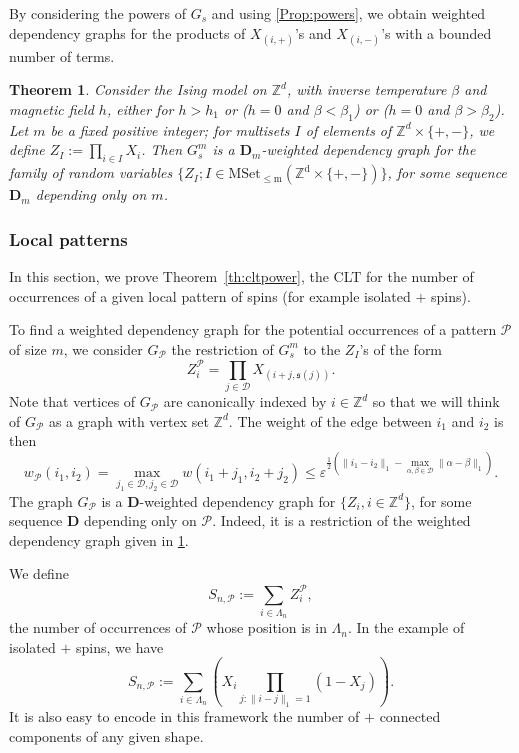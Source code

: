 \documentclass{amsart}
\newcommand{\field}[1]{\mathbb{#1}}
\newcommand{\Z}{\field{Z}}
\def\WDep{G}
\def\eps{\varepsilon}
\newcommand{\dist}[2]{\|#1 - #2\|_1}
\numberwithin{equation}{section}
\newtheorem{theorem}{Theorem}[section]
\theoremstyle{remark}
\begin{document}
By considering the powers of $\WDep_s$ and using \cref{Prop:powers},
we obtain weighted dependency graphs for the products of $X_{(i,+)}$'s and $X_{(i,-)}$'s with a bounded number of terms.
\begin{theorem}
Consider the Ising model on $\Z^d$, with inverse temperature $\beta$ and magnetic field $h$, either 
for $h > h_1$ or ($h=0$ and $\beta < \beta_1$) or ($h=0$ and $\beta > \beta_2$). 
Let $m$ be a fixed positive integer; 
for multisets $I$ of elements of $\Z^d \times \{+,-\}$, we define
$Z_I := \prod_{i \in I} X_i$.
Then $\WDep_s^m$ is a $\mathbf{D}_m$-weighted dependency graph for the family of random variables
$\{Z_I;I \in \mathrm{MSet_{\leq m}\left(\Z^d \times \{+,-\}\right)}\}$, for some sequence  $\mathbf{D}_m$ depending only on $m$.
  \label{th:powers}
\end{theorem}



\subsubsection{Local patterns}
In this section, we prove Theorem~\ref{th:cltpower}, the CLT for the number of occurrences of a given local pattern
of spins (for example isolated $+$ spins).

To find a weighted dependency graph for the potential occurrences
of a pattern $\mathcal{P}$ of size $m$, we consider $\WDep_{\mathcal{P}}$ the restriction of $\WDep_s^m$ to the $Z_I$'s of the form
\begin{equation}
  Z_i^{\mathcal{P}}= \prod_{j \in \mathcal{D}} X_{(i+j,\mathfrak{s}(j))}.
  \label{eq:ZiP}
\end{equation}
Note that vertices of $\WDep_{\mathcal{P}}$ are canonically indexed by $i \in \Z^d$
so that we will think of $\WDep_{\mathcal{P}}$ as a graph with vertex set $\Z^d$.
The weight of the edge between $i_1$ and $i_2$ is then
\[w_{\mathcal{P}}(i_1,i_2)=\max_{j_1 \in \mathcal{D},j_2 \in \mathcal{D}} w(i_1+j_1,i_2+j_2) \le 
\eps^{\frac{1}{2} \left(\dist{i_1}{i_2} - \max_{\alpha,\beta \in \mathcal{D}} \dist{\alpha}{\beta}\right)}.\]
The graph $\WDep_{\mathcal{P}}$ is a $\mathbf{D}$-weighted dependency graph for $\{Z_i, i \in \Z^d\}$,
for some sequence $\mathbf{D}$ depending only on $\mathcal{P}$.
Indeed, it is a restriction of the weighted dependency graph given in \cref{th:powers}.


We define
$$S_{n,\mathcal{P}} := \sum_{i \in \Lambda_n} Z_i^{\mathcal{P}},$$
the number of occurrences of $\mathcal{P}$ whose position is in $\Lambda_n$.
In the example of isolated $+$ spins, we have
$$S_{n,\mathcal{P}} := \sum_{i \in \Lambda_{n} } \left(X_{i} \prod_{j : \dist{i}{j}=1} (1-X_j) \right).$$
It is also easy to encode in this framework the number of $+$ connected components of any given shape.
\end{document}
